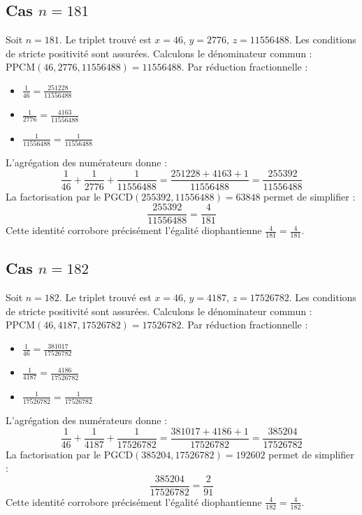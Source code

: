 \documentclass[11pt,a4paper]{article}
\begin{document}
\subsection{Cas $n = 181$}
Soit $n = 181$. Le triplet trouvé est $x = 46$, $y = 2776$, $z = 11556488$.
Les conditions de stricte positivité sont assurées.
Calculons le dénominateur commun : $\text{PPCM}(46, 2776, 11556488) = 11556488$.
Par réduction fractionnelle :
\begin{itemize}
    \item $\frac{1}{46} = \frac{251228}{11556488}$
    \item $\frac{1}{2776} = \frac{4163}{11556488}$
    \item $\frac{1}{11556488} = \frac{1}{11556488}$
\end{itemize}
L'agrégation des numérateurs donne :
$$ \frac{1}{46} + \frac{1}{2776} + \frac{1}{11556488} = \frac{251228 + 4163 + 1}{11556488} = \frac{255392}{11556488} $$
La factorisation par le $\text{PGCD}(255392, 11556488) = 63848$ permet de simplifier :
$$ \frac{255392}{11556488} = \frac{4}{181} $$
Cette identité corrobore précisément l'égalité diophantienne $\frac{4}{181} = \frac{4}{181}$.

\subsection{Cas $n = 182$}
Soit $n = 182$. Le triplet trouvé est $x = 46$, $y = 4187$, $z = 17526782$.
Les conditions de stricte positivité sont assurées.
Calculons le dénominateur commun : $\text{PPCM}(46, 4187, 17526782) = 17526782$.
Par réduction fractionnelle :
\begin{itemize}
    \item $\frac{1}{46} = \frac{381017}{17526782}$
    \item $\frac{1}{4187} = \frac{4186}{17526782}$
    \item $\frac{1}{17526782} = \frac{1}{17526782}$
\end{itemize}
L'agrégation des numérateurs donne :
$$ \frac{1}{46} + \frac{1}{4187} + \frac{1}{17526782} = \frac{381017 + 4186 + 1}{17526782} = \frac{385204}{17526782} $$
La factorisation par le $\text{PGCD}(385204, 17526782) = 192602$ permet de simplifier :
$$ \frac{385204}{17526782} = \frac{2}{91} $$
Cette identité corrobore précisément l'égalité diophantienne $\frac{4}{182} = \frac{4}{182}$.
\end{document}
